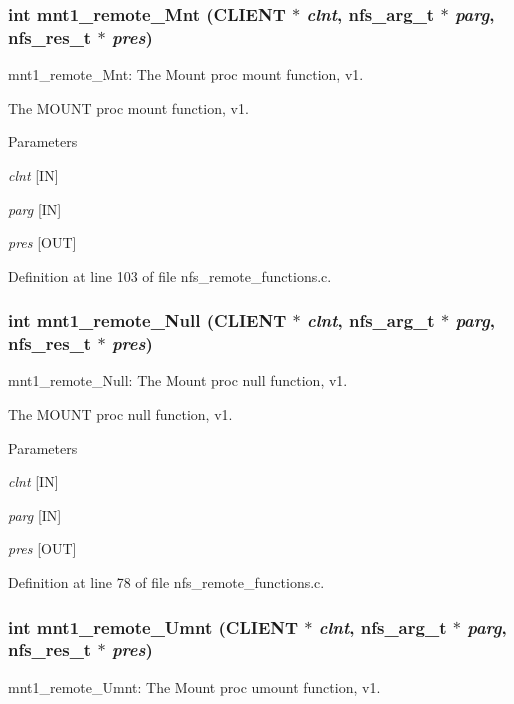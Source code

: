 \subsubsection[{mnt1\_\-remote\_\-Mnt}]{\setlength{\rightskip}{0pt plus 5cm}int mnt1\_\-remote\_\-Mnt (CLIENT $\ast$ {\em clnt}, \/  nfs\_\-arg\_\-t $\ast$ {\em parg}, \/  nfs\_\-res\_\-t $\ast$ {\em pres})}\label{group__MNTprocs_ga2cd45bf3102b89de5890480fb99db4ae}
mnt1\_\-remote\_\-Mnt: The Mount proc mount function, v1.

The MOUNT proc mount function, v1.


\begin{DoxyParams}{Parameters}
\item[{\em clnt}][IN] \item[{\em parg}][IN] \item[{\em pres}][OUT] \end{DoxyParams}


Definition at line 103 of file nfs\_\-remote\_\-functions.c.
\subsubsection[{mnt1\_\-remote\_\-Null}]{\setlength{\rightskip}{0pt plus 5cm}int mnt1\_\-remote\_\-Null (CLIENT $\ast$ {\em clnt}, \/  nfs\_\-arg\_\-t $\ast$ {\em parg}, \/  nfs\_\-res\_\-t $\ast$ {\em pres})}\label{group__MNTprocs_ga57af674c6a6985abc2c91f26ab22fcde}
mnt1\_\-remote\_\-Null: The Mount proc null function, v1.

The MOUNT proc null function, v1.


\begin{DoxyParams}{Parameters}
\item[{\em clnt}][IN] \item[{\em parg}][IN] \item[{\em pres}][OUT] \end{DoxyParams}


Definition at line 78 of file nfs\_\-remote\_\-functions.c.
\subsubsection[{mnt1\_\-remote\_\-Umnt}]{\setlength{\rightskip}{0pt plus 5cm}int mnt1\_\-remote\_\-Umnt (CLIENT $\ast$ {\em clnt}, \/  nfs\_\-arg\_\-t $\ast$ {\em parg}, \/  nfs\_\-res\_\-t $\ast$ {\em pres})}\label{group__MNTprocs_ga12436609c27ab5881d690c41981e7bb1}
mnt1\_\-remote\_\-Umnt: The Mount proc umount function, v1.

